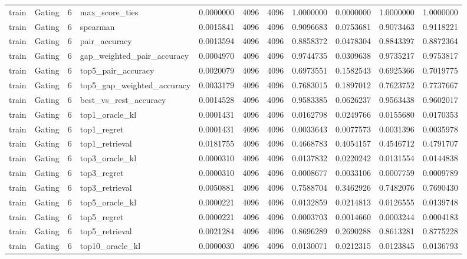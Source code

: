 \begin{tabular}{llrlrrrrrrr}
train & Gating & 6 & max_score_ties & 0.0000000 & 4096 & 4096 & 1.0000000 & 0.0000000 & 1.0000000 & 1.0000000 \\
train & Gating & 6 & spearman & 0.0015841 & 4096 & 4096 & 0.9096683 & 0.0753681 & 0.9073463 & 0.9118221 \\
train & Gating & 6 & pair_accuracy & 0.0013594 & 4096 & 4096 & 0.8858372 & 0.0478304 & 0.8843397 & 0.8872364 \\
train & Gating & 6 & gap_weighted_pair_accuracy & 0.0004970 & 4096 & 4096 & 0.9744735 & 0.0309638 & 0.9735217 & 0.9753817 \\
train & Gating & 6 & top5_pair_accuracy & 0.0020079 & 4096 & 4096 & 0.6973551 & 0.1582543 & 0.6925366 & 0.7019775 \\
train & Gating & 6 & top5_gap_weighted_accuracy & 0.0033179 & 4096 & 4096 & 0.7683015 & 0.1897012 & 0.7623752 & 0.7737667 \\
train & Gating & 6 & best_vs_rest_accuracy & 0.0014528 & 4096 & 4096 & 0.9583385 & 0.0626237 & 0.9563438 & 0.9602017 \\
train & Gating & 6 & top1_oracle_kl & 0.0001431 & 4096 & 4096 & 0.0162798 & 0.0249766 & 0.0155680 & 0.0170353 \\
train & Gating & 6 & top1_regret & 0.0001431 & 4096 & 4096 & 0.0033643 & 0.0077573 & 0.0031396 & 0.0035978 \\
train & Gating & 6 & top1_retrieval & 0.0181755 & 4096 & 4096 & 0.4668783 & 0.4054157 & 0.4546712 & 0.4791707 \\
train & Gating & 6 & top3_oracle_kl & 0.0000310 & 4096 & 4096 & 0.0137832 & 0.0220242 & 0.0131554 & 0.0144838 \\
train & Gating & 6 & top3_regret & 0.0000310 & 4096 & 4096 & 0.0008677 & 0.0033106 & 0.0007759 & 0.0009789 \\
train & Gating & 6 & top3_retrieval & 0.0050881 & 4096 & 4096 & 0.7588704 & 0.3462926 & 0.7482076 & 0.7690430 \\
train & Gating & 6 & top5_oracle_kl & 0.0000221 & 4096 & 4096 & 0.0132859 & 0.0214813 & 0.0126555 & 0.0139748 \\
train & Gating & 6 & top5_regret & 0.0000221 & 4096 & 4096 & 0.0003703 & 0.0014660 & 0.0003244 & 0.0004183 \\
train & Gating & 6 & top5_retrieval & 0.0021284 & 4096 & 4096 & 0.8696289 & 0.2690288 & 0.8613281 & 0.8775228 \\
train & Gating & 6 & top10_oracle_kl & 0.0000030 & 4096 & 4096 & 0.0130071 & 0.0212315 & 0.0123845 & 0.0136793 \\

\end{tabular}
